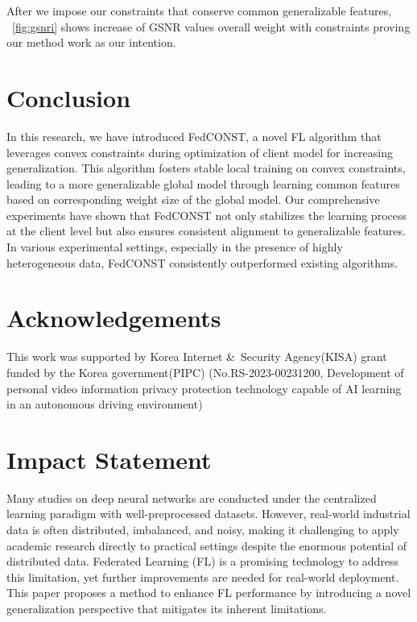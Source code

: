 \documentclass{article}
\theoremstyle{plain}
\theoremstyle{definition}
\theoremstyle{remark}
\begin{document}
After we impose our constraints that conserve common generalizable features, ~\cref{fig:gsnri} shows increase of GSNR values overall weight with constraints proving our method work as our intention. %

\section{Conclusion}
In this research, we have introduced FedCONST, a novel FL algorithm that leverages convex constraints during optimization of client model for increasing generalization. This algorithm fosters stable local training on convex constraints, leading to a more generalizable global model through learning common features based on corresponding weight size of the global model. Our comprehensive experiments have shown that FedCONST not only stabilizes the learning process at the client level but also ensures consistent alignment to generalizable features. In various experimental settings, especially in the presence of highly heterogeneous data, FedCONST consistently outperformed existing algorithms.
\section*{Acknowledgements}
This work was supported by Korea Internet \&\ Security Agency(KISA) grant funded by the Korea government(PIPC) (No.RS-2023-00231200, Development of personal video information privacy protection technology capable of AI learning in an autonomous driving environment)
\section*{Impact Statement}
Many studies on deep neural networks are conducted under the centralized learning paradigm with well-preprocessed datasets. However, real-world industrial data is often distributed, imbalanced, and noisy, making it challenging to apply academic research directly to practical settings despite the enormous potential of distributed data. Federated Learning (FL) is a promising technology to address this limitation, yet further improvements are needed for real-world deployment. This paper proposes a method to enhance FL performance by introducing a novel generalization perspective that mitigates its inherent limitations.
\end{document}
